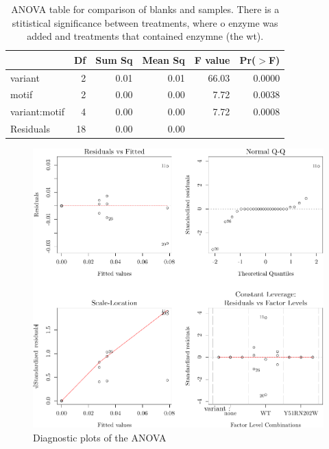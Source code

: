 \documentclass[]{tufte-handout}
\newenvironment{Shaded}{}{}
\newcommand{\KeywordTok}[1]{\textcolor[rgb]{0.00,0.44,0.13}{\textbf{{#1}}}}
\newcommand{\DataTypeTok}[1]{\textcolor[rgb]{0.56,0.13,0.00}{{#1}}}
\newcommand{\StringTok}[1]{\textcolor[rgb]{0.25,0.44,0.63}{{#1}}}
\newcommand{\NormalTok}[1]{{#1}}
\begin{document}
\begin{Shaded}
\end{Shaded}

\begin{table}[ht]
\centering
\begin{tabular}{lrrrrr}
  \toprule
 & Df & Sum Sq & Mean Sq & F value & Pr($>$F) \\ 
  \midrule
variant       & 2 & 0.01 & 0.01 & 66.03 & 0.0000 \\ 
  motif         & 2 & 0.00 & 0.00 & 7.72 & 0.0038 \\ 
  variant:motif & 4 & 0.00 & 0.00 & 7.72 & 0.0008 \\ 
  Residuals     & 18 & 0.00 & 0.00 &  &  \\ 
   \bottomrule
\end{tabular}
\caption{ANOVA table for comparison of blanks and samples. There is a stitistical significance between treatments, where o enzyme was added and treatments that contained enzymne (the wt).} 
\end{table}\begin{figure}
 \includegraphics{tufte_files/figure-latex/unnamed-chunk-4-1.pdf}
\caption{Diagnostic plots of the ANOVA}
\end{figure}
\end{document}
